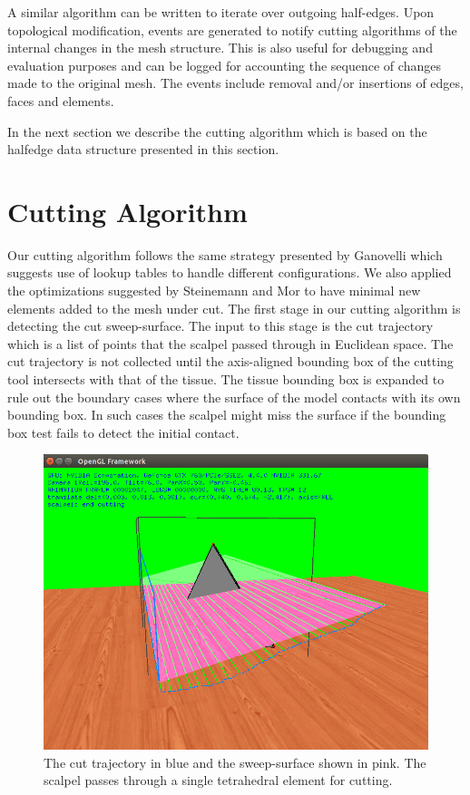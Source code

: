 A similar algorithm can be written to iterate over outgoing half-edges. Upon topological modification, events are generated to 
notify cutting algorithms of the internal changes in the mesh structure. This is also useful for debugging and evaluation purposes and
can be logged for accounting the sequence of changes made to the original mesh. The events include removal and/or insertions of edges,
 faces and elements.


In the next section we describe the cutting algorithm which is based on the halfedge data structure presented in this section.

\section{Cutting Algorithm}
Our cutting algorithm follows the same strategy presented by Ganovelli \etal \cite{Ganovelli2000} which suggests use of lookup tables to 
handle different configurations. We also applied the optimizations suggested by
Steinemann and Mor \etal \cite{Steinemann, Mor2000} to have minimal new elements added to the mesh under cut. 
The first stage in our cutting algorithm is detecting the cut sweep-surface. The input to this stage is the cut trajectory which is a list of points
that the scalpel passed through in Euclidean space. The cut trajectory is not collected until the axis-aligned bounding box of the cutting tool intersects
with that of the tissue. The tissue bounding box is expanded to rule out the boundary cases where the surface of the model contacts with its own bounding 
box. In such cases the scalpel might miss the surface if the bounding box test fails to detect the initial contact. 

\begin{figure}[H]
  \centering
  \includegraphics[width=0.8\linewidth]{figures/cutting/sweep_surface.png}
  \caption{\label{fig:sweepsurf}
  {The cut trajectory in blue and the sweep-surface shown in pink. The scalpel passes through a single 
  tetrahedral element for cutting.}
}
\end{figure}

